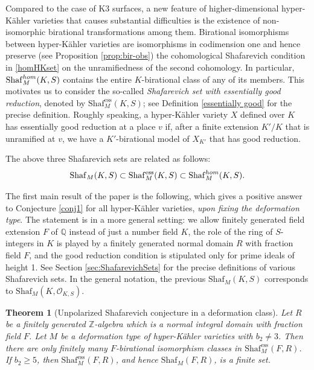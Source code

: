 \documentclass[11pt,reqno,oneside]{amsart}
\numberwithin{equation}{section}
\newtheorem{theorem}{Theorem}[section]
\theoremstyle{definition}
\DeclareMathOperator{\ess}{ess}
\renewcommand{\hom}{{\rm hom}}
\newcommand{\Sha}{\mathrm{Shaf}}
\newcommand{\QQ}{\mathbb{Q}}
\newcommand{\ZZ}{\mathbb{Z}}
\begin{document}
	
Compared to the case of K3 surfaces, a new feature of higher-dimensional hyper-Kähler varieties that causes substantial difficulties is the existence of non-isomorphic birational transformations among them. Birational isomorphisms between hyper-Kähler varieties are isomorphisms in codimension one and hence preserve (see Proposition \ref{prop:bir-obs}) the cohomological Shafarevich condition in \eqref{homHKset} on the unramifiedness of the second cohomology. In particular, $\Sha_{M}^{\hom}(K,S)$ contains the entire $K$-birational class of any of its members. This motivates us to consider the so-called \textit{Shafarevich set with essentially good reduction}, denoted by $\Sha_{M}^{\ess}(K,S)$; see Definition \ref{essentially good} for the precise definition. Roughly speaking, a hyper-Kähler variety $X$ defined over $K$ has essentially good reduction at a place $v$ if, after a finite extension $K'/K$ that is unramified at $v$, we have a $K'$-birational model of $X_{K'}$ that has good reduction. 

	
The above three Shafarevich sets are related as follows:
\begin{equation}
    \Sha_{M}(K,S) \subset \Sha_{M}^{\ess}(K,S)\subset \Sha_{M}^{\hom}(K,S).
\end{equation}

\vspace{0.5cm}


The first main result of the paper is the following, which gives a positive answer to Conjecture \ref{conj1} for all hyper-Kähler varieties, \textit{upon fixing the deformation type}. The statement is in a more general setting: we allow finitely generated field extension $F$ of $\QQ$ instead of just a number field $K$, the role of the ring of $S$-integers in $K$ is played by a finitely generated normal domain $R$ with fraction field $F$, and the good reduction condition is stipulated only for prime ideals of height 1. See Section \ref{sec:ShafarevichSets} for the precise definitions of various Shafarevich sets. In the general notation, the previous $\Sha_M(K,S)$ corresponds to $\Sha_M(K, \mathcal{O}_{K,S})$.

\begin{theorem}[{Unpolarized Shafarevich conjecture in a deformation class}]\label{mainthm}
Let $R$ be a finitely generated $\ZZ$-algebra which is a normal integral domain with fraction field $F$. Let $M$ be a deformation type of hyper-Kähler varieties with $b_2\neq 3$.
Then there are only finitely many $F$-birational isomorphism classes in  $\Sha^{\ess}_M(F,R)$.\\ 
If $b_2\geq 5$, then $\Sha^{\ess}_M(F,R)$, and hence $\Sha_M(F,R)$, is a finite set. 
\end{theorem}
\end{document}
